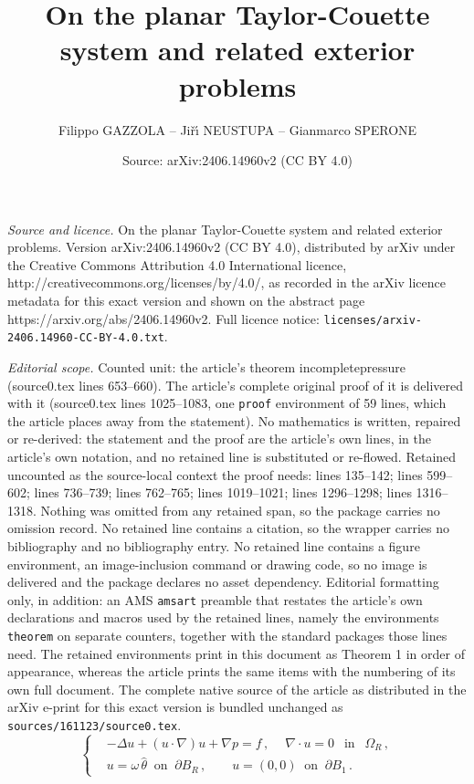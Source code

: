 \documentclass[10pt,a4paper]{amsart}
\title{On the planar Taylor-Couette system and related exterior problems}
\author{Filippo GAZZOLA -- Ji\v{r}\'{\i} NEUSTUPA -- Gianmarco SPERONE}
\date{Source: arXiv:2406.14960v2 (CC BY 4.0)}
\begin{document}
\maketitle

\noindent\emph{Source and licence.} On the planar Taylor-Couette system and related exterior problems. Version arXiv:2406.14960v2 (CC BY 4.0), distributed by arXiv under the Creative Commons Attribution 4.0 International licence, http://creativecommons.org/licenses/by/4.0/, as recorded in the arXiv licence metadata for this exact version and shown on the abstract page https://arxiv.org/abs/2406.14960v2. Full licence notice: \texttt{licenses/arxiv-2406.14960-CC-BY-4.0.txt}.\par\smallskip

\noindent\textit{Editorial scope.} Counted unit: the article's theorem incompletepressure (source0.tex lines 653--660). The article's complete original proof of it is delivered with it (source0.tex lines 1025--1083, one \texttt{proof} environment of 59 lines, which the article places away from the statement). No mathematics is written, repaired or re-derived: the statement and the proof are the article's own lines, in the article's own notation, and no retained line is substituted or re-flowed.  Retained uncounted as the source-local context the proof needs: lines 135--142; lines 599--602; lines 736--739; lines 762--765; lines 1019--1021; lines 1296--1298; lines 1316--1318.  Nothing was omitted from any retained span, so the package carries no omission record.  No retained line contains a citation, so the wrapper carries no bibliography and no bibliography entry.  No retained line contains a figure environment, an image-inclusion command or drawing code, so no image is delivered and the package declares no asset dependency.  Editorial formatting only, in addition: an AMS \texttt{amsart} preamble that restates the article's own declarations and macros used by the retained lines, namely the environments \texttt{theorem} on separate counters, together with the standard packages those lines need.  The retained environments print in this document as Theorem 1 in order of appearance, whereas the article prints the same items with the numbering of its own full document.  The complete native source of the article as distributed in the arXiv e-print for this exact version is bundled unchanged as \texttt{sources/161123/source0.tex}.
\begin{equation}\label{nsstokes0}
\left\{
\begin{aligned}
& -\Delta u+(u\cdot\nabla)u+\nabla p=f \, ,\ \quad  \nabla\cdot u=0 \ \ \mbox{ in } \ \ \Omega_{R} \, , \\[3pt]
& u = \omega \, \widehat{\theta} \ \text{ on } \ \partial B_R \, , \qquad u = (0,0) \ \text{ on } \ \partial B_{1} \, .
\end{aligned}
\right.
\end{equation}
\end{document}

